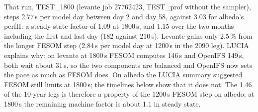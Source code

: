 \documentclass[11pt,a4paper]{article}
\begin{document}
That run, TEST\_1800 (levante job 27762423, TEST\_prof without the sampler), steps 2.77\,s per model day between day 2 and day 58, against 3.03 for albedo's perfH: a steady-state factor of 1.09 at 1800\,s, and 1.15 over the two months including the first and last day (182 against 210\,s). Levante gains only 2.5\,\% from the longer FESOM step (2.84\,s per model day at 1200\,s in the 2090 leg). LUCIA explains why: on levante at 1800\,s FESOM computes 146\,s and OpenIFS 149\,s, both wait about 31\,s, so the two components are balanced and OpenIFS now sets the pace as much as FESOM does. On albedo the LUCIA summary suggested FESOM still limits at 1800\,s; the timelines below show that it does not. The 1.46 of the 10-year legs is therefore a property of the 1200\,s FESOM step on albedo; at 1800\,s the remaining machine factor is about 1.1 in steady state.
\end{document}
